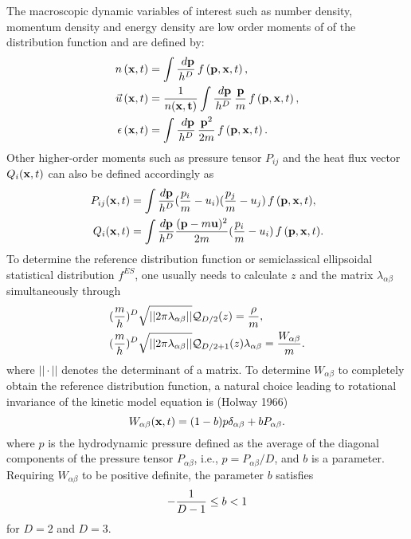 \documentclass{rsproca}%
\begin{document}
The macroscopic dynamic variables of interest such as number density, momentum density and energy density are low order moments of of the distribution function and are defined by:
\begin{align}
n\left({\bf x},t\right) &= \int{\frac{\ d{\bf p}}{h^D}}\,f\left({\bf p},{\bf x}, t\right), \\
\vec u \left({\bf x},t\right) &= {1\over n(\bf x, t) }\int{\frac{\ d{\bf p}}{h^D}\,\frac{\bf p}{m}}\,f\left({\bf p},{\bf x}, t\right), \\
{\epsilon}\left({\bf x},t\right) &= \int{\frac{\ d{\bf p}}{h^D}\,\frac{{\bf p}^2}{2m}}\,f\left({\bf p},{\bf x}, t\right).
\end{align}
Other higher-order moments such as pressure tensor $P_{ij}$ and the heat flux vector $Q_i({\bf x},t)$ can also be defined accordingly as
\begin{align}
P_{ij}({\bf x},t) &= \int{\frac{d{\bf p}}{h^D}(\frac{p_i}{m}-u_i)(\frac{p_j}{m}-u_j)\,f\,({\bf p},{\bf x},t)}, \\
Q_i({\bf x},t) &= \int{\frac{d{\bf p}}{h^D}\frac{({\bf p}-m{\bf u})^2}{2m}(\frac{p_i}{m}-u_i)\,f\,({\bf p},{\bf x},t)}.
\label{stressflux}
\end{align}
To determine the reference distribution function or semiclassical ellipsoidal statistical distribution $f^{ES}$, one usually needs to calculate $z$ and the matrix $\lambda_{\alpha \beta}$ simultaneously through
\begin{align}
&({m \over  h})^D \sqrt{ ||2 \pi \lambda_{\alpha \beta}|| } \mathcal{Q}_{D/2}(z)= {\rho \over m}, \\
&({m \over  h})^D \sqrt{ ||2 \pi \lambda_{\alpha \beta}|| } \mathcal{Q}_{D/2 +1}(z) \lambda_{\alpha \beta} = {W_{\alpha \beta} \over m} .
\end{align}
where $||\cdot ||$ denotes the determinant of a matrix.   To determine $W_{\alpha \beta}$ to completely obtain the reference distribution function, a natural choice leading to rotational invariance of the kinetic model equation is (Holway 1966)
\begin{equation}
W_{\alpha \beta}({\bf x},t) = (1 - b) p \delta_{\alpha \beta} + b P_{\alpha \beta}.
\end{equation}
where $p$ is the hydrodynamic pressure defined as the average of the diagonal components of the pressure tensor $P_{\alpha \beta}$, i.e., $p = P_{\alpha \beta}/D$, and $b$ is a parameter.  Requiring $ W_{\alpha \beta}$ to be positive definite, the parameter $b$ satisfies
\begin{align}
-{ 1\over D-1} \le b < 1
\end{align}
for $D=2$ and $D=3$.
\end{document}
